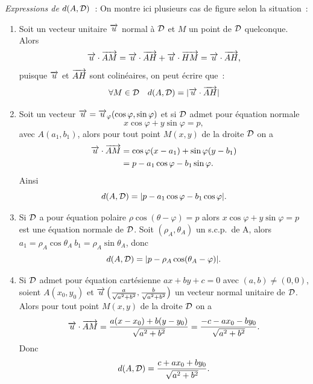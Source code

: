\emph{Expressions de \(d(A , \mathcal{D})\)}~:
On montre ici plusieurs cas de figure selon la situation~:
\begin{enumerate}
  \item Soit un vecteur unitaire \(\overrightarrow{u}\) normal à \(\mathcal{D}\) et \(M\) un point de 
    \(\mathcal{D}\) quelconque. Alors
    \begin{equation}
      \overrightarrow{u} \cdot \overrightarrow{AM} = \overrightarrow{u} \cdot \overrightarrow{AH} + \overrightarrow{u} \cdot \overrightarrow{HM} = \overrightarrow{u} 
      \cdot \overrightarrow{AH},
    \end{equation}
    puisque \(\overrightarrow{u}\) et \(\overrightarrow{AH}\) sont colinéaires, on peut écrire que~:
    \begin{equation}
      \forall M \in \mathcal{D} \quad d(A , \mathcal{D}) = |\overrightarrow{u} \cdot \overrightarrow{AH}|
    \end{equation}
  \item Soit un vecteur \(\overrightarrow{u} = \overrightarrow{u}_\varphi(\cos \varphi, \sin \varphi)\) et 
    si \(\mathcal{D}\) admet pour équation normale
    \begin{equation}
      x \cos \varphi + y \sin \varphi = p,
    \end{equation}
    avec \(A(a_1 , b_1)\), alors pour tout point \(M(x , y)\) de la droite 
    \(\mathcal{D}\) on a
    \begin{align}
      \overrightarrow{u} \cdot \overrightarrow{AM} &= \cos \varphi (x - a_1) + \sin \varphi (y - b_1)\\
                          &= p - a_1\cos\varphi -b_1\sin\varphi.
    \end{align}
    Ainsi
    \begin{equation}
      d(A , \mathcal{D}) = |p - a_1\cos\varphi - b_1\cos\varphi|.
    \end{equation}
  \item Si \(\mathcal{D}\) a pour équation polaire \(\rho\cos(\theta - \varphi) = p\) 
    alors \(x \cos \varphi + y \sin \varphi = p\) est une équation normale de 
    \(\mathcal{D}\). Soit \((\rho_A , \theta_A)\) un s.c.p.\ de A, alors \(a_1 = 
    \rho_A\cos\theta_A \ b_1 = \rho_A\sin\theta_A\), donc
    \begin{equation}
      d(A , \mathcal{D}) = |p - \rho_A\cos(\theta_A - \varphi)|.
    \end{equation}
  \item Si \(\mathcal{D}\) admet pour équation cartésienne \(ax + by + c = 0\) avec 
    \((a , b) \neq (0 , 0)\), soient \(A(x_0 , y_0)\) et \(\overrightarrow{u} 
    \left(\frac{a}{\sqrt{a^2 + b^2}}, \frac{b}{\sqrt{a^2 + b^2}}\right)\) un 
    vecteur normal unitaire de \(\mathcal{D}\). Alors pour tout point \(M(x , y)\) de 
    la droite \(\mathcal{D}\) on a
    \begin{equation}
      \overrightarrow{u}\cdot\overrightarrow{AM} = \frac{a(x - x_0) + b(y - y_0)}{\sqrt{a^2 + b^2}} = 
      \frac{-c - ax_0 - by_0}{\sqrt{a^2 + b^2}}.
    \end{equation}
    Donc
    \begin{equation}
      d(A , \mathcal{D}) = \frac{c + ax_0 + by_0}{\sqrt{a^2 + b^2}}.
    \end{equation}
\end{enumerate}


